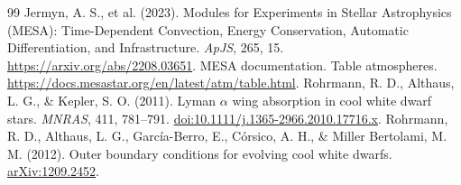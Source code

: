 \documentclass[11pt,letterpaper]{article}
\begin{document}
\begin{thebibliography}{99}\small
{} Jermyn, A. S., et al. (2023).
Modules for Experiments in Stellar Astrophysics (MESA): Time-Dependent
Convection, Energy Conservation, Automatic Differentiation, and Infrastructure.
\emph{ApJS}, 265, 15. \url{https://arxiv.org/abs/2208.03651}.
 MESA documentation. Table atmospheres.
\url{https://docs.mesastar.org/en/latest/atm/table.html}.
 Rohrmann, R. D., Althaus, L. G., \& Kepler, S. O. (2011).
Lyman $\alpha$ wing absorption in cool white dwarf stars.
\emph{MNRAS}, 411, 781--791.
\href{https://doi.org/10.1111/j.1365-2966.2010.17716.x}{doi:10.1111/j.1365-2966.2010.17716.x}.
 Rohrmann, R. D., Althaus, L. G., Garc\'ia-Berro, E.,
C\'orsico, A. H., \& Miller Bertolami, M. M. (2012).
Outer boundary conditions for evolving cool white dwarfs.
\href{https://arxiv.org/abs/1209.2452}{arXiv:1209.2452}.


\end{thebibliography}
\end{document}
